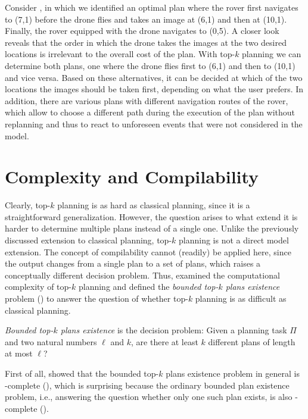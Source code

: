 \begin{example}\label{ex:top_k}
    Consider , in which we identified an optimal plan where the rover first navigates to (7,1) before the drone flies and takes an image at (6,1) and then at (10,1).
    Finally, the rover equipped with the drone navigates to (0,5).
    A closer look reveals that the order in which the drone takes the images at the two desired locations is irrelevant to the overall cost of the plan.
    With top-$k$ planning we can determine both plans, one where the drone flies first to (6,1) and then to (10,1) and vice versa.
    Based on these alternatives, it can be decided at which of the two locations the images should be taken first, depending on what the user prefers.
    In addition, there are various plans with different navigation routes of the rover, which allow to choose a different path during the execution of the plan without replanning and thus to react to unforeseen events that were not considered in the model.
\end{example}


\section{Complexity and Compilability}
Clearly, top-$k$ planning is as hard as classical planning, since it is a straightforward generalization.
However, the question arises to what extend it is harder to determine multiple plans instead of a single one.
Unlike the previously discussed extension to classical planning, top-$k$ planning is not a direct model extension.
The concept of compilability cannot (readily) be applied here, since the output changes from a single plan to a set of plans, which raises a conceptually different decision problem.
Thus, \textcite{speck-et-al-aaai2020} examined the computational complexity of top-$k$ planning and defined the \emph{bounded top-$k$ plans existence} problem () to answer the question of whether top-$k$ planning is as difficult as classical planning.

\begin{definition}\label{def:bounded-top-k-plan-existence}
    \emph{Bounded top-$k$ plans existence} is the decision problem: Given a planning task $\Pi$ and two natural numbers $\ell$ and $k$, are there at least $k$ different plans of length at most $\ell$?
\end{definition}

First of all, \textcite{speck-et-al-aaai2020} showed that the bounded top-$k$ plans existence problem in general is \PSPACE-complete (), which is surprising because the ordinary bounded plan existence problem, i.e., answering the question whether only one such plan exists, is also \PSPACE-complete ().

